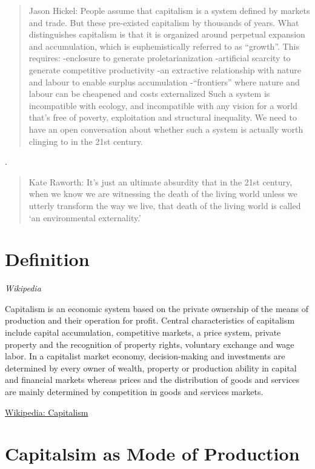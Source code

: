 \documentclass[
]{book}
\begin{document}
\begin{quote}
Jason Hickel: People assume that capitalism is a system
defined by markets and trade.
But these pre-existed capitalism by thousands of years.
What distinguishes capitalism is that it is organized around
perpetual expansion and accumulation,
which is euphemistically referred to as ``growth''.
This requires:
-enclosure to generate proletarianization
-artificial scarcity to generate competitive productivity
-an extractive relationship with nature and labour to enable surplus accumulation
-``frontiers'' where nature and labour can be cheapened and costs externalized
Such a system is incompatible with ecology, and incompatible with any vision
for a world that's free of poverty, exploitation and structural inequality.
We need to have an open conversation about whether such a system is actually
worth clinging to in the 21st century.
\end{quote}

.

\begin{quote}
Kate Raworth: It's just an ultimate absurdity that in the 21st century,
when we know we are witnessing the death of the living world
unless we utterly transform the way we live,
that death of the living world is called `an environmental externality.'
\end{quote}

\hypertarget{definition}{%
\section{Definition}\label{definition}}

\emph{Wikipedia}

Capitalism is an economic system based on the private ownership of the means of production and their operation for profit.
Central characteristics of capitalism include capital accumulation, competitive markets, a price system, private property and the recognition of property rights, voluntary exchange and wage labor.
In a capitalist market economy, decision-making and investments are determined by every owner of wealth, property or production ability in capital and financial markets whereas prices and the distribution of goods and services are mainly determined by competition in goods and services markets.

\href{https://en.wikipedia.org/wiki/Capitalism}{Wikipedia: Capitalism}

\hypertarget{capitalsim-as-mode-of-production}{%
\section{Capitalsim as Mode of Production}\label{capitalsim-as-mode-of-production}}
\end{document}
